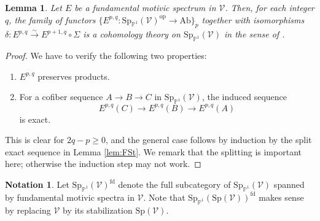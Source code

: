 \documentclass{amsart}
\theoremstyle{plain}
\newtheorem{lemma}[theorem]{Lemma}
\theoremstyle{definition}
\newtheorem{notation}[theorem]{Notation}
\theoremstyle{remark}
\numberwithin{equation}{theorem}
\newcommand{\Ab}{\mathrm{Ab}}
\newcommand{\Sp}{\mathrm{Sp}}
\newcommand{\V}{\mathcal{V}}
\newcommand{\fd}{\mathrm{fd}}
\newcommand{\op}{\mathrm{op}}
\newcommand{\SpP}{\mathrm{Sp}_{\mathbb{P}^1}}
\begin{document}
\begin{lemma}\label{lem:FSt2}
Let $E$ be a fundamental motivic spectrum in $\V$.
Then, for each integer $q$, the family of functors $\{E^{p,q}\colon\SpP(\V)^\op\to\Ab\}_p$ together with isomorphisms $\delta\colon E^{p,q}\xrightarrow{\sim}E^{p+1,q}\circ\Sigma$ is a cohomology theory on $\SpP(\V)$ in the sense of \cite[1.4.1.6]{HA}.
\end{lemma}
\begin{proof}
We have to verify the following two properties:
\begin{enumerate}
\item $E^{p,q}$ preserves products.
\item For a cofiber sequence $A\to B\to C$ in $\SpP(\V)$, the induced sequence
\[
	E^{p,q}(C) \to E^{p,q}(B) \to E^{p,q}(A) 
\]
is exact.
\end{enumerate}
This is clear for $2q-p\ge 0$, and the general case follows by induction by the split exact sequence in Lemma \ref{lem:FSt}.
We remark that the splitting is important here; otherwise the induction step may not work.
\end{proof}

\begin{notation}
Let $\SpP(\V)^\fd$ denote the full subcategory of $\SpP(\V)$ spanned by fundamental motivic spectra in $\V$.
Note that $\SpP(\Sp(\V))^\fd$ makes sense by replacing $\V$ by its stabilization $\Sp(\V)$.
\end{notation}
\end{document}
